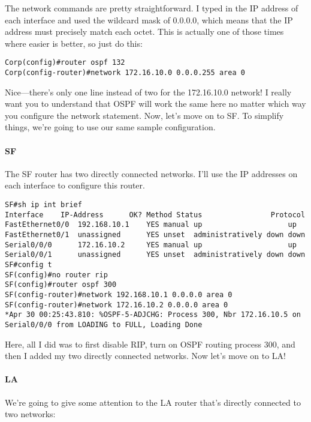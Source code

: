 The network commands are pretty straightforward. I typed in the IP
address of each interface and used the wildcard mask of 0.0.0.0, which
means that the IP address must precisely match each octet. This is
actually one of those times where easier is better, so just do this:

\begin{verbatim}
Corp(config)#router ospf 132
Corp(config-router)#network 172.16.10.0 0.0.0.255 area 0
\end{verbatim}

Nice---there's only one line instead of two for the 172.16.10.0 network!
I really want you to understand that OSPF will work the same here no
matter which way you configure the network statement. Now, let's move on
to SF. To simplify things, we're going to use our same sample
configuration.

\paragraph{SF}

The SF router has two directly connected networks. I'll use the IP
addresses on each interface to configure this router.

\begin{verbatim}
SF#sh ip int brief
Interface    IP-Address      OK? Method Status                Protocol
FastEthernet0/0  192.168.10.1    YES manual up                    up
FastEthernet0/1  unassigned      YES unset  administratively down down
Serial0/0/0      172.16.10.2     YES manual up                    up
Serial0/0/1      unassigned      YES unset  administratively down down
SF#config t
SF(config)#no router rip
SF(config)#router ospf 300
SF(config-router)#network 192.168.10.1 0.0.0.0 area 0
SF(config-router)#network 172.16.10.2 0.0.0.0 area 0
*Apr 30 00:25:43.810: %OSPF-5-ADJCHG: Process 300, Nbr 172.16.10.5 on Serial0/0/0 from LOADING to FULL, Loading Done
\end{verbatim}

Here, all I did was to first disable RIP, turn on OSPF routing process
300, and then I added my two directly connected networks. Now let's move
on to LA!

\paragraph{LA}

We're going to give some attention to the LA router that's directly
connected to two networks:


